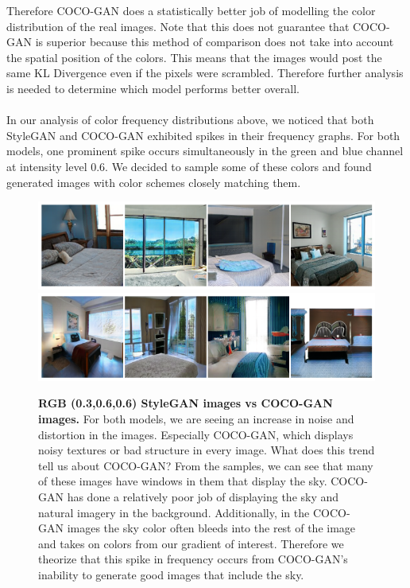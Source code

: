 \documentclass{article}
\begin{document}
        Therefore COCO-GAN does a statistically better job of modelling the color distribution of the real images. Note that this does not guarantee that COCO-GAN is superior because this method of comparison does not take into account the spatial position of the colors. This means that the images would post the same KL Divergence even if the pixels were scrambled. Therefore further analysis is needed to determine which model performs better overall.
        \\
        \\
         In our analysis of color frequency distributions above, we noticed that both StyleGAN and COCO-GAN exhibited spikes in their frequency graphs.
        For both models, one prominent spike occurs simultaneously in the green and blue channel at intensity level 0.6.
        We decided to sample some of these colors and found generated images with color schemes closely matching them.
        
        \begin{figure}[H]
          \centering
          \includegraphics[scale=0.25]{color-images/03_06_06_stylegan_images.png} 
          \includegraphics[scale=0.25]{color-images/03_06_06_coco_images.png}
          \caption{\textbf{RGB (0.3,0.6,0.6) StyleGAN images vs COCO-GAN images.}
            For both models, we are seeing an increase in noise and distortion in the images.
            Especially COCO-GAN,  which displays noisy textures or bad structure in every image.
            What does this trend tell us about COCO-GAN?
            From the samples, we can see that many of these images have windows in them that display the sky.
            COCO-GAN has done a relatively poor job of displaying the sky and natural imagery in the background.
            Additionally, in the COCO-GAN images the sky color often bleeds into the rest of the image and takes on colors from our gradient of interest.
            Therefore we theorize that this spike in frequency occurs from COCO-GAN's inability to generate good images that include the sky.
        }
        \end{figure}
\end{document}
